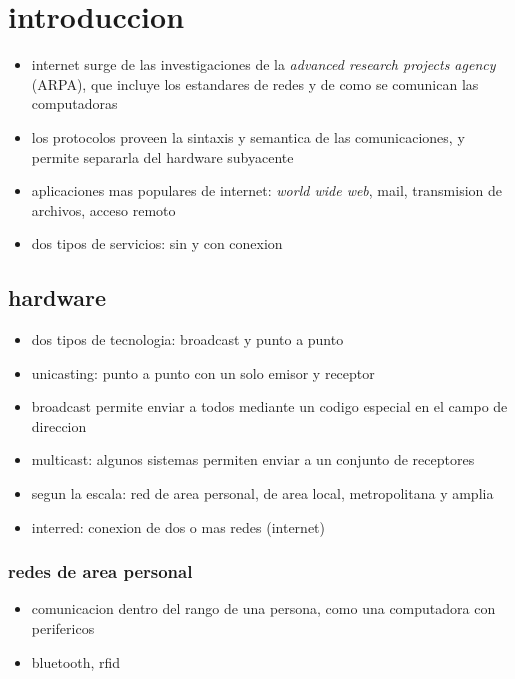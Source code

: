 \documentclass[11pt]{article}
\date{\today}
\title{}
\begin{document}
\tableofcontents

\section{introduccion}
\label{sec:org01f7c18}
\begin{itemize}
\item internet surge de las investigaciones de la \emph{advanced research projects agency} (ARPA), que incluye los estandares de redes y de como se comunican las computadoras
\item los protocolos proveen la sintaxis y semantica de las comunicaciones, y permite separarla del hardware subyacente
\item aplicaciones mas populares de internet: \emph{world wide web}, mail, transmision de archivos, acceso remoto
\item dos tipos de servicios: sin y con conexion
\end{itemize}
\subsection{hardware}
\label{sec:org747b895}
\begin{itemize}
\item dos tipos de tecnologia: broadcast y punto a punto
\item unicasting: punto a punto con un solo emisor y receptor
\item broadcast permite enviar a todos mediante un codigo especial en el campo de direccion
\item multicast: algunos sistemas permiten enviar a un conjunto de receptores
\item segun la escala: red de area personal, de area local, metropolitana y amplia
\item interred: conexion de dos o mas redes (internet)
\end{itemize}
\subsubsection{redes de area personal}
\label{sec:org15d582c}
\begin{itemize}
\item comunicacion dentro del rango de una persona, como una computadora con perifericos
\item bluetooth, rfid
\end{itemize}
\end{document}
